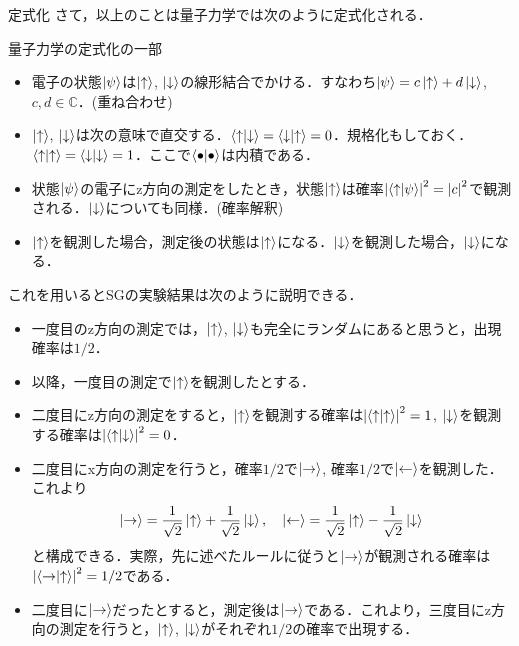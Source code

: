 \documentclass[dvipdfmx]{beamer}
\theoremstyle{break}
\newcommand{\up}{\ket{\uparrow}}
\newcommand{\down}{\ket{\downarrow}}
\newcommand{\C}{\mathbb{C}}
\begin{document}
\begin{frame}[allowframebreaks]{定式化}
		さて，以上のことは量子力学では次のように定式化される．

		\begin{block}{量子力学の定式化の一部}
				\begin{itemize}
						\item 電子の状態$\ket{\psi}$は$\up$, $\down$の線形結合でかける．すなわち$\ket{\psi}=c\up + d\down$, $c, d\in \C$．(重ね合わせ)
						\item $\up$, $\down$は次の意味で直交する．$\braket{\uparrow}{\downarrow} = \braket{\downarrow}{\uparrow} = 0$．規格化もしておく．$\braket{\uparrow}{\uparrow} = \braket{\downarrow}{\downarrow} = 1$．ここで$\braket{\bullet}{\bullet}$は内積である．
						\item 状態$\ket{\psi}$の電子にz方向の測定をしたとき，状態$\up$は確率$\abs{\braket{\uparrow}{\psi}}^2=\abs{c}^2$で観測される．$\down$についても同様．(確率解釈)
						\item $\up$を観測した場合，測定後の状態は$\up$になる．$\down$を観測した場合，$\down$になる．
				\end{itemize}
		\end{block}
		\newpage
		これを用いるとSGの実験結果は次のように説明できる．

		\begin{itemize}
				\item 一度目のz方向の測定では，$\up$, $\down$も完全にランダムにあると思うと，出現確率は$1/2$．
				\item 以降，一度目の測定で$\up$を観測したとする．
				\item 二度目にz方向の測定をすると，$\up$を観測する確率は$\abs{\braket{\uparrow}{\uparrow}}^2 = 1$, $\down$を観測する確率は$\abs{\braket{\uparrow}{\downarrow}}^2 = 0$．
				\item 二度目にx方向の測定を行うと，確率$1/2$で$\ket{\rightarrow}$, 確率$1/2$で$\ket{\leftarrow}$を観測した．これより
						\begin{align*}
								\ket{\rightarrow} = \frac{1}{\sqrt{2}}\up + \frac{1}{\sqrt{2}}\down,\quad
								\ket{\leftarrow} = \frac{1}{\sqrt{2}}\up - \frac{1}{\sqrt{2}}\down
						\end{align*}
						と構成できる．実際，先に述べたルールに従うと$\ket{\rightarrow}$が観測される確率は$\abs{\braket{\rightarrow}{\uparrow}}^2 = 1/2$である．
				\item 二度目に$\ket{\rightarrow}$だったとすると，測定後は$\ket{\rightarrow}$である．これより，三度目にz方向の測定を行うと，$\up$, $\down$がそれぞれ$1/2$の確率で出現する．
		\end{itemize}
\end{frame}
\end{document}
